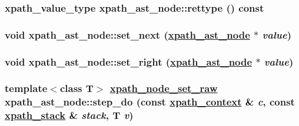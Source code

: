 \hypertarget{classxpath__ast__node_2c3598521141ed4b763fe6c4f852234f}{
\subsubsection[rettype]{\setlength{\rightskip}{0pt plus 5cm}xpath\_\-value\_\-type xpath\_\-ast\_\-node::rettype () const}}
\label{classxpath__ast__node_2c3598521141ed4b763fe6c4f852234f}


\hypertarget{classxpath__ast__node_2764184d076834284eb3ff3182b845cc}{
\subsubsection[set\_\-next]{\setlength{\rightskip}{0pt plus 5cm}void xpath\_\-ast\_\-node::set\_\-next (\hyperlink{classxpath__ast__node}{xpath\_\-ast\_\-node} $\ast$ {\em value})}}
\label{classxpath__ast__node_2764184d076834284eb3ff3182b845cc}


\hypertarget{classxpath__ast__node_fe044146db852b7d4dbf188fd2ff6c75}{
\subsubsection[set\_\-right]{\setlength{\rightskip}{0pt plus 5cm}void xpath\_\-ast\_\-node::set\_\-right (\hyperlink{classxpath__ast__node}{xpath\_\-ast\_\-node} $\ast$ {\em value})}}
\label{classxpath__ast__node_fe044146db852b7d4dbf188fd2ff6c75}


\hypertarget{classxpath__ast__node_326147ab8def5110e44deafd73b20393}{
\subsubsection[step\_\-do]{\setlength{\rightskip}{0pt plus 5cm}template$<$class T$>$ \hyperlink{classxpath__node__set__raw}{xpath\_\-node\_\-set\_\-raw} xpath\_\-ast\_\-node::step\_\-do (const \hyperlink{structxpath__context}{xpath\_\-context} \& {\em c}, const \hyperlink{structxpath__stack}{xpath\_\-stack} \& {\em stack}, T {\em v})}}
\label{classxpath__ast__node_326147ab8def5110e44deafd73b20393}


